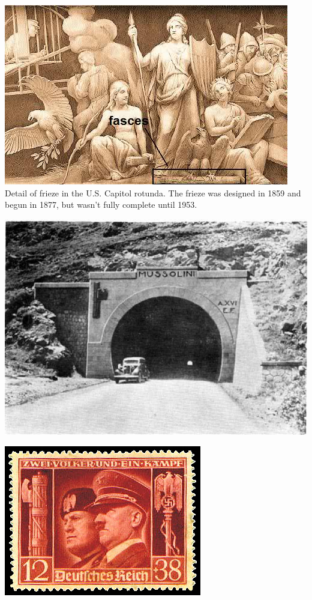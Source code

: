 \begin{frame}
    \centering
    \includegraphics[height=.8\textheight]{img/fasces/teut1.jpg} \\
    Detail of frieze in the U.S. Capitol rotunda. The frieze was designed in 1859 and begun in 1877, but wasn't fully complete until 1953. \\
\end{frame}
\begin{frame}
    \centering
    \includegraphics[width=.9\textwidth]{img/fasces/tunnel.jpg} \\
\end{frame}
\begin{frame}
    \centering
    \includegraphics[width=.9\textwidth]{img/reich-stamp.png} \\
\end{frame}

